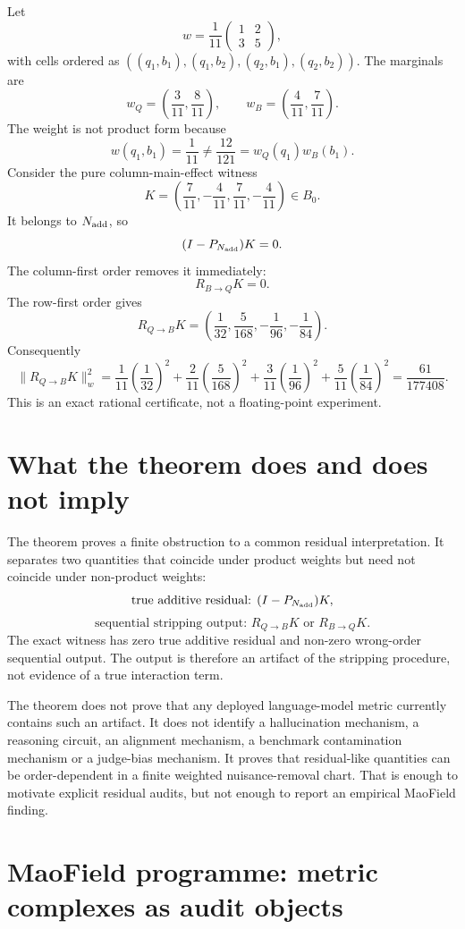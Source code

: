 \documentclass[11pt]{article}
\theoremstyle{remark}
\newcommand{\RQBt}{R_{Q\to B}}
\newcommand{\RBQt}{R_{B\to Q}}
\begin{document}
Let
\[
w=\frac1{11}\begin{pmatrix}1&2\\3&5\end{pmatrix},
\]
with cells ordered as $((q_1,b_1),(q_1,b_2),(q_2,b_1),(q_2,b_2))$. The marginals are
\[
w_Q=\left(\frac3{11},\frac8{11}\right),\qquad
w_B=\left(\frac4{11},\frac7{11}\right).
\]
The weight is not product form because
\[
w(q_1,b_1)=\frac1{11}\neq \frac{12}{121}=w_Q(q_1)w_B(b_1).
\]
Consider the pure column-main-effect witness
\[
K=\left(\frac7{11},-\frac4{11},\frac7{11},-\frac4{11}\right)\in B_0.
\]
It belongs to $N_{\rm add}$, so
\[
(I-P_{N_{\rm add}})K=0.
\]
The column-first order removes it immediately:
\[
\RBQt K=0.
\]
The row-first order gives
\[
\RQBt K=
\left(\frac1{32},\frac5{168},-\frac1{96},-\frac1{84}\right).
\]
Consequently
\[
\|\RQBt K\|_w^2
=\frac1{11}\left(\frac1{32}\right)^2
+\frac2{11}\left(\frac5{168}\right)^2
+\frac3{11}\left(\frac1{96}\right)^2
+\frac5{11}\left(\frac1{84}\right)^2
=\frac{61}{177408}.
\]
This is an exact rational certificate, not a floating-point experiment.

\section{What the theorem does and does not imply}

The theorem proves a finite obstruction to a common residual interpretation. It separates two quantities that coincide under product weights but need not coincide under non-product weights:
\[
\text{true additive residual: }(I-P_{N_{\rm add}})K,
\]
\[
\text{sequential stripping output: }\RQBt K\text{ or }\RBQt K.
\]
The exact witness has zero true additive residual and non-zero wrong-order sequential output. The output is therefore an artifact of the stripping procedure, not evidence of a true interaction term.

The theorem does not prove that any deployed language-model metric currently contains such an artifact. It does not identify a hallucination mechanism, a reasoning circuit, an alignment mechanism, a benchmark contamination mechanism or a judge-bias mechanism. It proves that residual-like quantities can be order-dependent in a finite weighted nuisance-removal chart. That is enough to motivate explicit residual audits, but not enough to report an empirical MaoField finding.

\section{MaoField programme: metric complexes as audit objects}
\end{document}
